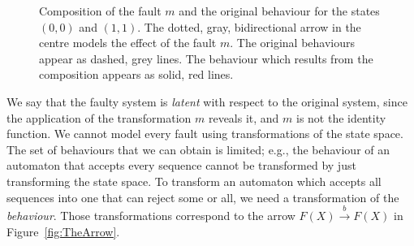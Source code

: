 \begin{figure}[t]
    \centering
    \caption{Composition of the fault $m$ and the original behaviour for the states $(0,0)$ and $(1,1)$. The dotted, gray, bidirectional arrow in the centre models the effect of the fault $m$. The original behaviours appear as dashed, grey lines. The behaviour which results from the composition appears as solid, red lines.}
    \label{fig:ExampleWithFaults}
\end{figure}
We say that the faulty system is \emph{latent} with respect to the original system, since the application of the transformation $m$ reveals it, and $m$ is not the identity function. 
We cannot model every fault using transformations of the state space. The set of behaviours that we can obtain is limited; e.g., the behaviour of an automaton that accepts every sequence cannot be transformed by just transforming the state space. 
To transform an automaton which accepts all sequences into one that can reject some or all, we need a transformation of the \emph{behaviour}. 
Those transformations correspond to the arrow $F(X)\xrightarrow{b}F(X)$ in Figure~\ref{fig:TheArrow}. 

